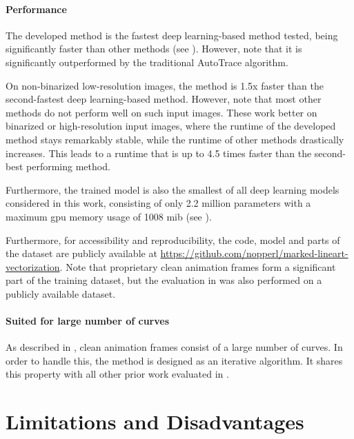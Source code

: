 \paragraph{Performance}
The developed method is the fastest deep learning-based method tested, being significantly faster than other methods (see ). However, note that it is significantly outperformed by the traditional AutoTrace \citep{autotrace} algorithm.

On non-binarized low-resolution images, the method is 1.5x faster than the second-fastest deep learning-based method. However, note that most other methods do not perform well on such input images. These work better on binarized or high-resolution input images, where the runtime of the developed method stays remarkably stable, while the runtime of other methods drastically increases. This leads to a runtime that is up to 4.5 times faster than the second-best performing method.

Furthermore, the trained model is also the smallest of all deep learning models considered in this work, consisting of only 2.2 million parameters with a maximum \gls{gpu} memory usage of 1008 \gls{mib} (see ).

Furthermore, for accessibility and reproducibility, the code, model and parts of the dataset are publicly available at \url{https://github.com/nopperl/marked-lineart-vectorization}.
Note that proprietary clean animation frames form a significant part of the training dataset, %
but the evaluation in  was also performed on a publicly available dataset.

\paragraph{Suited for large number of curves}
As described in , clean animation frames consist of a large number of curves. In order to handle this, the method is designed as an iterative algorithm. It shares this property with all other prior work evaluated in .

\section{Limitations and Disadvantages}
\label{sec:limitations}

